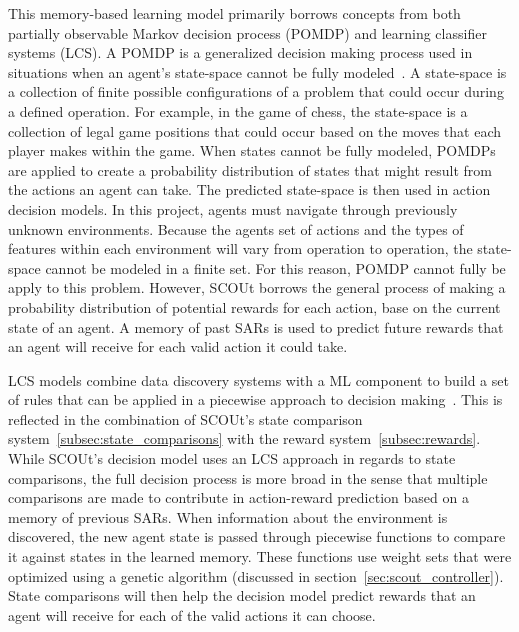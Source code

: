 This memory-based learning model primarily borrows concepts from both partially observable Markov decision process (POMDP) and learning classifier systems (LCS).
A POMDP is a generalized decision making process used in situations when an agent's state-space cannot be fully modeled~\cite{r_cassandra_survey_1998, shani_survey_2013}.
A state-space is a collection of finite possible configurations of a problem that could occur during a defined operation.
For example, in the game of chess, the state-space is a collection of legal game positions that could occur based on the moves that each player makes within the game.
When states cannot be fully modeled, POMDPs are applied to create a probability distribution of states that might result from the actions an agent can take.
The predicted state-space is then used in action decision models.
In this project, agents must navigate through previously unknown environments.
Because the agents set of actions and the types of features within each environment will vary from operation to operation, the state-space cannot be modeled in a finite set.
For this reason, POMDP cannot fully be apply to this problem.
However, SCOUt borrows the general process of making a probability distribution of potential rewards for each action, base on the current state of an agent.
A memory of past SARs is used to predict future rewards that an agent will receive for each valid action it could take.

LCS models combine data discovery systems with a ML component to build a set of rules that can be applied in a piecewise approach to decision making~\cite{sigaud_learning_2007}.
This is reflected in the combination of SCOUt's state comparison system~\ref{subsec:state_comparisons} with the reward system~\ref{subsec:rewards}.
While SCOUt's decision model uses an LCS approach in regards to state comparisons, the full decision process is more broad in the sense that multiple comparisons are made to contribute in action-reward prediction based on a memory of previous SARs.
When information about the environment is discovered, the new agent state is passed through piecewise functions to compare it against states in the learned memory.
These functions use weight sets that were optimized using a genetic algorithm (discussed in section~\ref{sec:scout_controller}).
State comparisons will then help the decision model predict rewards that an agent will receive for each of the valid actions it can choose.





